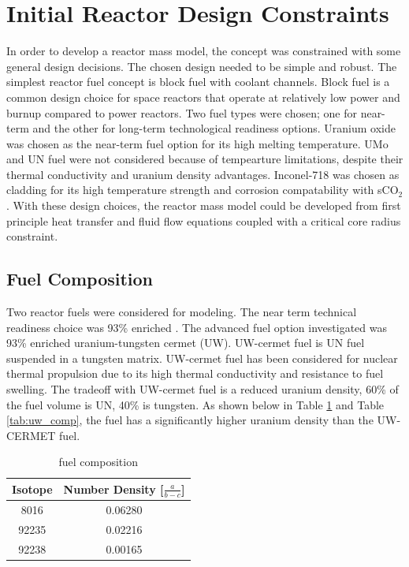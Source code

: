 \section{Initial Reactor Design Constraints}
    In order to develop a reactor mass model, the concept was constrained with
some general design decisions. The chosen design needed to be simple and robust. 
The simplest reactor fuel concept is block fuel with coolant channels. 
Block fuel is a common design choice for space reactors that operate at relatively 
low power and burnup compared to power reactors. Two fuel types were chosen; one for
near-term and the other for long-term technological readiness options. Uranium
oxide was chosen as the near-term fuel option for its high melting temperature.
UMo and UN fuel were not considered because of tempearture limitations, despite
their thermal conductivity and uranium density advantages. Inconel-718 was
chosen as cladding for its high temperature strength and corrosion
compatability with sCO$_2$. With these design choices, the reactor mass model
could be developed from first principle heat transfer and fluid flow equations
coupled with a critical core radius constraint.

\subsection{Fuel Composition}
Two reactor fuels were considered for modeling. The near term technical
readiness choice was 93\% enriched \uox. The advanced fuel option investigated
was 93\% enriched uranium-tungsten cermet (UW). UW-cermet fuel is UN fuel suspended in a
tungsten matrix. UW-cermet fuel has been considered for nuclear thermal
propulsion due to its high thermal conductivity and resistance to fuel swelling.
The tradeoff with UW-cermet fuel is a reduced uranium density, 60\% of the fuel
volume is UN, 40\% is tungsten. As shown below in Table \ref{tab:uox_comp} and
Table \ref{tab:uw_comp}, the \uox fuel has a significantly higher uranium
density than the UW-CERMET fuel.

\begin{table}[h]
  \centering
  \caption{\uox fuel composition}
  \begin{tabular}{cc}
    \toprule
    Isotope   & Number Density [$\frac{a}{b-c}$] \\
    \midrule
    8016	&	0.06280	\\
    92235	&	0.02216	\\
    92238	&	0.00165	\\
  \end{tabular}
  \label{tab:uox_comp}
\end{table}
    
